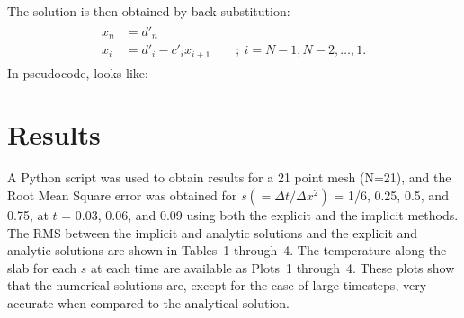 \documentclass[twocolumn,10pt]{asme2ej}
\begin{document}
The solution is then obtained by back substitution:
\begin{multline}
\begin{split}
x_n & = d'_n\, \\
x_i & = d'_i - c'_i x_{i + 1} \qquad ; \ i = N - 1, N - 2, \ldots, 1.
\end{split}
\end{multline}
In pseudocode, looks like:\\
\begin{algorithmic}
\EndWhile
\end{algorithmic}

\section{Results}

A Python script was used to obtain results for a 21 point mesh (N=21), and the Root Mean Square error was obtained for $s(=\Delta t/ \Delta x^2)$ = 1/6, 0.25, 0.5, and 0.75, at $t$ = 0.03, 0.06, and 0.09 using both the explicit and the implicit methods. The RMS between the implicit and analytic solutions and the explicit and analytic solutions are shown in Tables~1 through~4. The temperature along the slab for each $s$ at each time are available as Plots~1 through~4. These plots show that the numerical solutions are, except for the case of large timesteps, very accurate when compared to the analytical solution.
\end{document}
